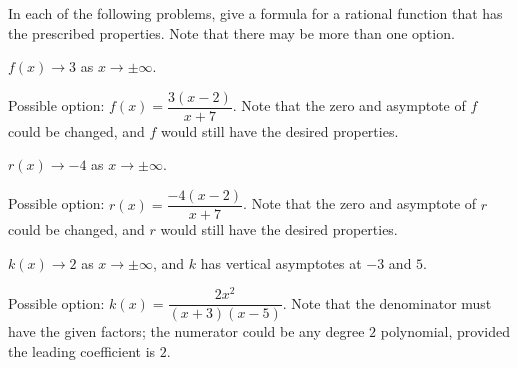 \begin{exercises}
\begin{problem}
In each of the following problems, give a formula for a rational function that 
has the prescribed properties. Note that there may be more than one option.
\begin{subproblem}
	$f(x)\rightarrow 3$ as $x\rightarrow\pm\infty$.
	\begin{shortsolution}
		Possible option: $f(x)=\dfrac{3(x-2)}{x+7}$. Note that 
		the zero and asymptote of $f$ could be changed, and $f$ would still have the desired properties.
	\end{shortsolution}
\end{subproblem}
\begin{subproblem}
	$r(x)\rightarrow -4$ as $x\rightarrow\pm\infty$.
	\begin{shortsolution}
		Possible option: $r(x)=\dfrac{-4(x-2)}{x+7}$. Note that 
		the zero and asymptote of $r$ could be changed, and $r$ would still have the desired properties.
	\end{shortsolution}
\end{subproblem}
\begin{subproblem}
	$k(x)\rightarrow 2$ as $x\rightarrow\pm\infty$, and $k$ has vertical asymptotes at $-3$ and $5$.
	\begin{shortsolution}
		Possible option: $k(x)=\dfrac{2x^2}{(x+3)(x-5)}$. Note that the denominator 
		must have the given factors; the numerator could be any degree $2$ polynomial, provided the 
		leading coefficient is $2$.
	\end{shortsolution}
\end{subproblem}
\end{problem}


\end{exercises}
